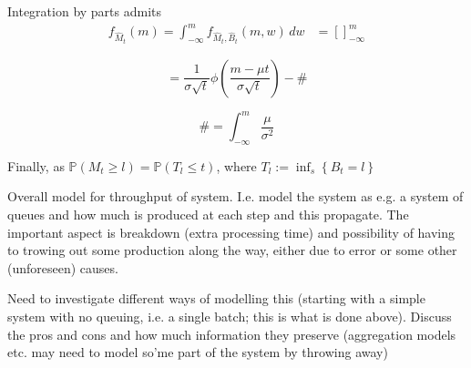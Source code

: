 \documentclass[../Thesis.tex]{subfiles}
\begin{document}
Integration by parts admits
\begin{align*}
    f_{\hat{M}_t} (m) = \int_{-\infty}^m f_{\hat{M}_t, \hat{B}_t} (m,w)\, dw & = \left[\right]_{-\infty}^m
\end{align*}


$$= \frac{1}{\sigma \sqrt{t}} \phi \left(\frac{m-\mu t}{\sigma \sqrt{t}}\right) - \#$$


$$ \# = \int_{-\infty}^m \frac{\mu}{\sigma^2} $$

\newpage
Finally, as $\mathbb{P} (M_t \geq l) = \mathbb{P}(T_l \leq t)$, where $T_l := \inf_s \left\{ B_t = l \right\}$





Overall model for throughput of system. I.e. model the system as e.g. a system of queues and how much is produced at each step and this propagate. The important aspect is breakdown (extra processing time) and possibility of having to trowing out some production along the way, either due to error or some other (unforeseen) causes.

Need to investigate different ways of modelling this (starting with a simple system with no queuing, i.e. a single batch; this is what is done above). Discuss the pros and cons and how much information they preserve (aggregation models etc. may need to model so'me part of the system by throwing away)
\end{document}
